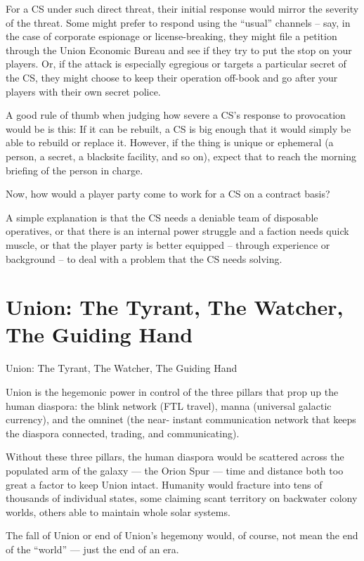For a CS under such direct threat, their initial response would mirror the severity of the threat.
Some might prefer to respond using the “usual” channels -- say, in the case of corporate
espionage or license-breaking, they might file a petition through the Union Economic Bureau and
see if they try to put the stop on your players. Or, if the attack is especially egregious or targets a
particular secret of the CS, they might choose to keep their operation off-book and go after your
players with their own secret police.

A good rule of thumb when judging how severe a CS’s response to provocation would be is this: If
it can be rebuilt, a CS is big enough that it would simply be able to rebuild or replace it. However,
if the thing is unique or ephemeral (a person, a secret, a blacksite facility, and so on), expect that
to reach the morning briefing of the person in charge.

Now, how would a player party come to work for a CS on a contract basis?

A simple explanation is that the CS needs a deniable team of disposable operatives, or that there
is an internal power struggle and a faction needs quick muscle, or that the player party is better
equipped -- through experience or background -- to deal with a problem that the CS needs
solving.




\section{Union: The Tyrant, The Watcher, The Guiding Hand}

Union: The Tyrant, The Watcher, The
Guiding Hand

Union is the hegemonic power in control of the three pillars that prop up the human diaspora:
the blink network (FTL travel), manna (universal galactic currency), and the omninet (the near-
instant communication network that keeps the diaspora connected, trading, and
communicating).


Without these three pillars, the human diaspora would be scattered across the populated arm of
the galaxy — the Orion Spur — time and distance both too great a factor to keep Union intact.
Humanity would fracture into tens of thousands of individual states, some claiming scant territory
on backwater colony worlds, others able to maintain whole solar systems.


The fall of Union or end of Union’s hegemony would, of course, not mean the end of the “world”
— just the end of an era.


